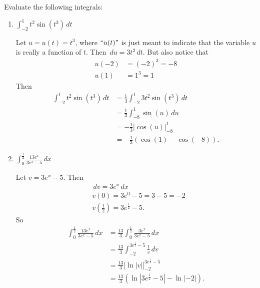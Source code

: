\documentclass[nooutcomes, handout]{ximera}
\renewcommand{\d}{\,d}
\newcommand{\eval}[1]{\bigg[ #1 \bigg]}
\begin{document}
	
\begin{problem}
Evaluate the following integrals:

	\begin{enumerate}
	
	\item  $\int_{-2}^1 t^2 \sin(t^3) \d t$
		\begin{freeResponse}
		Let $u=u(t) = t^3$, where $``u(t)"$ is just meant to indicate that the variable $u$ is really a function of $t$.  Then $\d u = 3t^2 \d t$.  But also notice that
			\begin{align*}
			u(-2) &= (-2)^3 = -8  \\
			u(1) &= 1^3 = 1
			\end{align*}
		Then
			\begin{align*}
			\int_{-2}^1 t^2 \sin(t^3) \d t &= \frac{1}{3} \int_{-2}^1 3 t^2 \sin(t^3) \d t  \\
			&= \frac{1}{3} \int_{-8}^1 \sin(u) \d u  \\
			&= - \frac{1}{3} \eval{\cos(u)}_{-8}^1  \\
			&= - \frac{1}{3} ( \cos(1) - \cos(-8)).
			\end{align*}
		\end{freeResponse}
		
		
		
	\item  $\int_0^{\frac{1}{2}} \frac{13e^x}{3e^x - 5} \d x$
		\begin{freeResponse}
		Let $v=3e^x - 5$.  Then
			\begin{align*}
			&\d v = 3e^x \d x  \\
			&v(0) = 3e^0 -5= 3-5=-2  \\
			&v\left( \frac{1}{2} \right) = 3e^{\frac{1}{2}} - 5.
			\end{align*}
		So
			\begin{align*}
			\int_0^{\frac{1}{2}} \frac{13e^x}{3e^x - 5} \d x &= \frac{13}{3} \int_0^{\frac{1}{2}} \frac{3e^x}{3e^x - 5} \d x  \\
			&= \frac{13}{3} \int_{-2}^{3e^{\frac{1}{2}}-5} \frac{1}{v} \d v  \\
			&= \frac{13}{3} \eval{\ln|v|}_{-2}^{3e^{\frac{1}{2}}-5}  \\
			&= \frac{13}{3} \left( \ln|3e^{\frac{1}{2}}-5| - \ln|-2| \right).  \\
			\end{align*}
		\end{freeResponse}
		
		
		
	\end{enumerate}
			
			
	
\end{problem}
\end{document}
